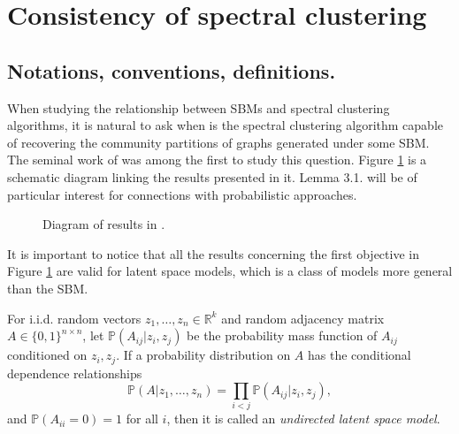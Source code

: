 \documentclass[../../main.tex]{subfiles} %
\begin{document}
	
	\section{Consistency of spectral clustering}
	
	\subsection{Notations, conventions, definitions.}
	 When studying the relationship between SBMs and 
	spectral clustering algorithms, it is natural to ask when is the 
	spectral clustering algorithm capable of recovering the community 
	partitions of graphs generated under some SBM. The seminal work of 
	\cite{rohe_spectral_2011} was among the first to study this question. 
	Figure \ref{fig:tikz-diagram-rohe} is a schematic diagram linking the 
	results presented in it. Lemma 3.1. will be of particular interest for 
	connections with probabilistic approaches.
	
	\begin{figure}
		\caption{Diagram of results in \cite{rohe_spectral_2011}.}
		\label{fig:tikz-diagram-rohe}
	\end{figure}
	 
	 It is important to notice 
	that all the results concerning the first objective in Figure 
	\ref{fig:tikz-diagram-rohe} are valid for latent space models, which is a 
	class of models more general than the SBM.
	
	\begin{definition}
		For i.i.d. random vectors \(z_1, \dots, z_n \in \mathbb R^{k}\) and 
		random 
		adjacency matrix \(A \in \{0,1\}^{n \times n}\), let \(\mathbb P 
		(A_{ij} 
		\vert z_i, z_j)\) be the probability mass function of \(A_{ij}\) 
		conditioned on \(z_i, z_j\). If a probability distribution on \(A\) has 
		the 
		conditional dependence relationships
		\begin{equation*}
			\mathbb P (A \vert z_1, \dots, z_n) = \prod_{i < j} \mathbb P 
			(A_{ij} 
			\vert z_i, z_j),
		\end{equation*}
		and \(\mathbb P (A_{ii} = 0) = 1\) for all \(i\), then it is called an 
		\textit{undirected latent space model}.
	\end{definition}
	
\end{document}
